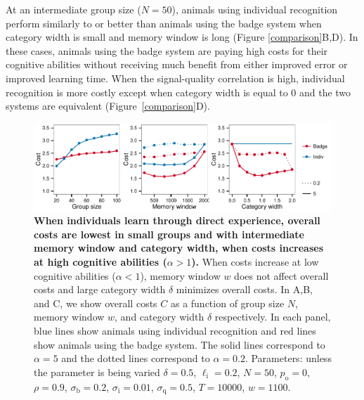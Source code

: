 At an intermediate group size ($N=50$), animals using individual recognition perform similarly to or better than animals using the badge system when category width is small and memory window is long (Figure \ref{comparison}B,D). In these cases, animals using the badge system are paying high costs for their cognitive abilities without receiving much benefit from either improved error or improved learning time. When the signal-quality correlation is high, individual recognition is more costly except when category width is equal to $0$ and the two systems are equivalent (Figure~\ref{comparison}D). 

\begin{figure}
\includegraphics[width=6.85in]{figures/costs.pdf}
\caption{\sffamily\small\textbf{When individuals learn through direct experience, overall costs are lowest in small groups and with intermediate memory window and category width, when costs increases at high cognitive abilities ($\alpha>1$).} When costs increase at low cognitive abilities ($\alpha<1$), memory window $w$ does not affect overall costs and large category width $\delta$ minimizes overall costs. In A,B, and C, we show overall costs $C$ as a function of group size $N$, memory window $w$, and category width $\delta$ respectively. In each panel, blue lines show animals using individual recognition and red lines show animals using the badge system. The solid lines correspond to $\alpha=5$ and the dotted lines correspond to $\alpha=0.2$.  Parameters: unless the parameter is being varied $\delta = 0.5$, $\ell_\text{i}=0.2$, $N=50$, $p_\text{o}=0$, $\rho=0.9$, $\sigma_\text{b}=0.2$, $\sigma_\text{i}=0.01$, $\sigma_\text{q}=0.5$, $T=10000$, $w=1100$.}
\label{costs}
\end{figure}

